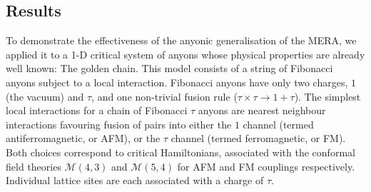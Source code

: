 \documentclass[aps,prb,reprint,superscriptaddress,amsfonts,amsmath,amssymb,showpacs,floatfix]{revtex4-1}
\newcommand{\mc}[1]{\mathcal{#1}}
\newcommand{\rcite}[1]{Ref.~\onlinecite{#1}} %
\newcommand{\citestop}[1]{.\cite{#1}}
\begin{document}
\subsection{Results}

To demonstrate the effectiveness of the anyonic generalisation of the MERA, we applied it to a {1-D} critical system of anyons whose physical properties are already well known: The golden chain\citestop{feiguin2007} This model consists of a string of Fibonacci anyons subject to a local interaction. Fibonacci anyons have only two charges, $1$ (the vacuum) and $\tau$, and one non-trivial fusion rule ($\tau\times\tau\rightarrow 1+\tau$). %
The simplest local interactions for a chain of Fibonacci $\tau$ anyons are nearest neighbour interactions favouring fusion of pairs into either the $1$ channel (termed antiferromagnetic, or AFM), or the $\tau$ channel (termed ferromagnetic, or FM). Both choices correspond to critical Hamiltonians, associated with the conformal field theories $\mc{M}(4,3)$ and $\mc{M}(5,4)$ for AFM and FM couplings respectively. Individual lattice sites are each associated with a charge of $\tau$.
\end{document}
